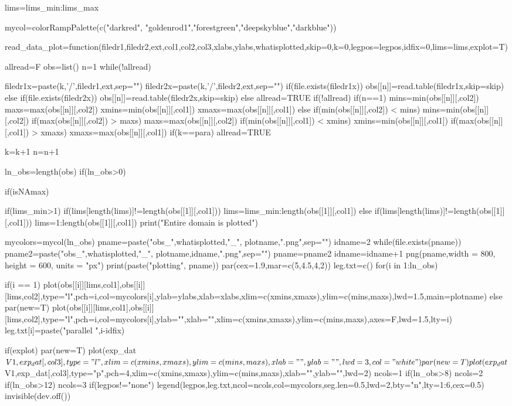 lims=lims\_min:lims\_max

mycol=colorRampPalette(c("darkred", "goldenrod1","forestgreen","deepskyblue","darkblue"))

read\_data\_plot=function(filedr1,filedr2,ext,col1,col2,col3,xlabs,ylabs,whatisplotted,skip=0,k=0,legpos=legpos,idfix=0,lims=lims,explot=T){
	allread=F
	obs=list()
	n=1
	while(!allread){
		filedr1x=paste(k,'/',filedr1,ext,sep="")
		filedr2x=paste(k,'/',filedr2,ext,sep="")
		if(file.exists(filedr1x)){
			obs[[n]]=read.table(filedr1x,skip=skip)
		}else if(file.exists(filedr2x)){
			obs[[n]]=read.table(filedr2x,skip=skip)
		}else{
			allread=TRUE
		}
		if(!allread){
			if(n==1){
				mins=min(obs[[n]][,col2])
				maxs=max(obs[[n]][,col2])
				xmins=min(obs[[n]][,col1])
				xmaxs=max(obs[[n]][,col1])
			}else{
				if(min(obs[[n]][,col2]) < mins){
					mins=min(obs[[n]][,col2])
				}
				if(max(obs[[n]][,col2]) > maxs){
					maxs=max(obs[[n]][,col2])
				}
				if(min(obs[[n]][,col1]) < xmins){
					xmins=min(obs[[n]][,col1])
				}
				if(max(obs[[n]][,col1]) > xmaxs){
					xmaxs=max(obs[[n]][,col1])
				}
			}
		}
		if(k==para){
			allread=TRUE
		}
		
		k=k+1
		n=n+1
	}
	
	ln\_obs=length(obs)
	if(ln\_obs>0){
		if(isNAmax){
			if(lims\_min>1){
				if(lims[length(lims)]!=length(obs[[1]][,col1])){
					lims=lims\_min:length(obs[[1]][,col1])
				}
			}else{
				if(lims[length(lims)]!=length(obs[[1]][,col1])){
					lims=1:length(obs[[1]][,col1])
					print("Entire domain is plotted")
				}
			}
			
			
		}
		mycolors=mycol(ln\_obs)
		pname=paste("obs\_",whatisplotted,"\_", plotname,".png",sep="")
		idname=2
		while(file.exists(pname)){
			pname2=paste("obs\_",whatisplotted,"\_", plotname,idname,".png",sep="")
			pname=pname2
			idname=idname+1
		}
		png(pname,width = 800, height = 600, units = "px")
		print(paste("plotting", pname))
		par(cex=1.9,mar=c(5,4.5,4,2))
		leg.txt=c()
		for(i in 1:ln\_obs){
			if(i == 1){
				plot(obs[[i]][lims,col1],obs[[i]][lims,col2],type="l",pch=i,col=mycolors[i],ylab=ylabs,xlab=xlabs,xlim=c(xmins,xmaxs),ylim=c(mins,maxs),lwd=1.5,main=plotname)
			}else{
				par(new=T)
				plot(obs[[i]][lims,col1],obs[[i]][lims,col2],type="l",pch=i,col=mycolors[i],ylab="",xlab="",xlim=c(xmins,xmaxs),ylim=c(mins,maxs),axes=F,lwd=1.5,lty=i)
			} 
			leg.txt[i]=paste("parallel ",i-idfix)
			
		}
		if(explot){
			par(new=T)
			plot(exp\_dat$V1,exp_dat[,col3],type="l",xlim=c(xmins,xmaxs),ylim=c(mins,maxs),xlab="",ylab="",lwd=3,col="white")
			par(new=T)
			plot(exp_dat$V1,exp\_dat[,col3],type="p",pch=4,xlim=c(xmins,xmaxs),ylim=c(mins,maxs),xlab="",ylab="",lwd=2)
		}
		ncols=1
		if(ln\_obs>8){
			ncols=2
		}
		if(ln\_obs>12){
			ncols=3
		}
		if(legpos!="none"){
			legend(legpos,leg.txt,ncol=ncols,col=mycolors,seg.len=0.5,lwd=2,bty="n",lty=1:6,cex=0.5)
		}
		invisible(dev.off())
		
}}
